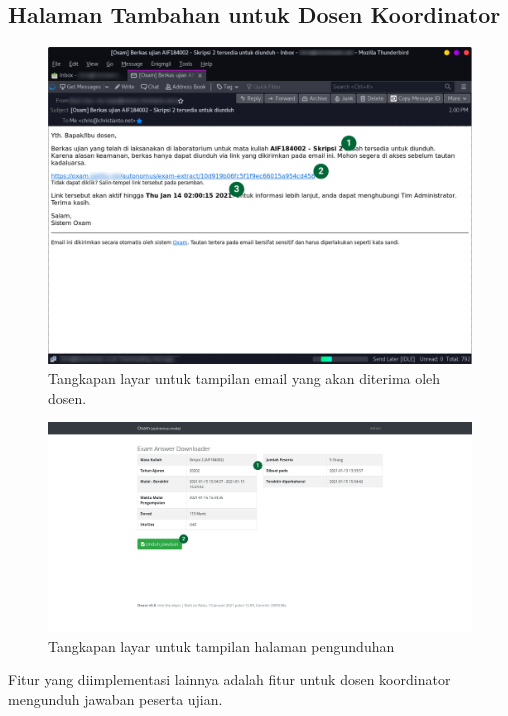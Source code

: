     \subsection{Halaman Tambahan untuk Dosen Koordinator}
    \begin{figure}
        \centering
        \includegraphics[width=0.7\paperwidth]{Gambar/implemented-interface/extra/extractor-email.png}
        \caption{Tangkapan layar untuk tampilan email yang akan diterima oleh dosen.}
        \label{fig:screenshot-extra-email}
    \end{figure}
    \begin{figure}
        \centering
        \includegraphics[width=0.7\paperwidth]{Gambar/implemented-interface/extra/extractor-page.png}
        \caption{Tangkapan layar untuk tampilan halaman pengunduhan}
        \label{fig:screenshot-extra-page}
    \end{figure}
    Fitur yang diimplementasi lainnya adalah fitur untuk dosen koordinator mengunduh jawaban peserta ujian.
